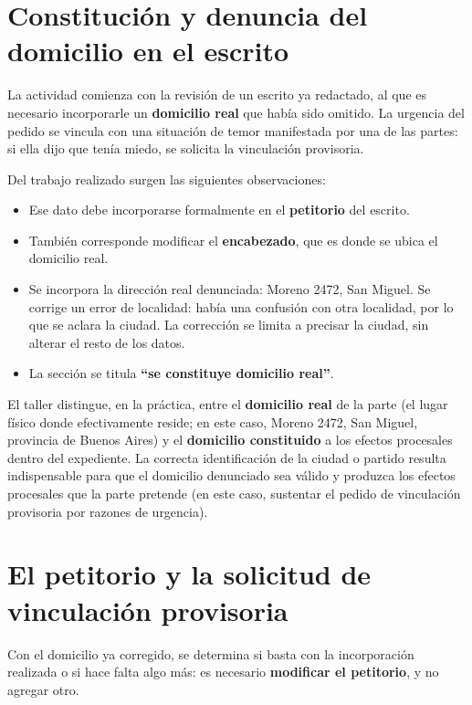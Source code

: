 \documentclass[12pt,oneside]{book}
\begin{document}
\section{Constituci\'on y denuncia del domicilio en el escrito}

La actividad comienza con la revisi\'on de un escrito ya redactado, al que es necesario incorporarle un \textbf{domicilio real} que hab\'ia sido omitido. La urgencia del pedido se vincula con una situaci\'on de temor manifestada por una de las partes: si ella dijo que ten\'ia miedo, se solicita la vinculaci\'on provisoria.

Del trabajo realizado surgen las siguientes observaciones:
\begin{itemize}
    \item Ese dato debe incorporarse formalmente en el \textbf{petitorio} del escrito.
    \item Tambi\'en corresponde modificar el \textbf{encabezado}, que es donde se ubica el domicilio real.
    \item Se incorpora la direcci\'on real denunciada: Moreno 2472, San Miguel. Se corrige un error de localidad: hab\'ia una confusi\'on con otra localidad, por lo que se aclara la ciudad. La correcci\'on se limita a precisar la ciudad, sin alterar el resto de los datos.
    \item La secci\'on se titula \textbf{``se constituye domicilio real''}.
\end{itemize}

\begin{important}
El taller distingue, en la pr\'actica, entre el \textbf{domicilio real} de la parte (el lugar f\'isico donde efectivamente reside; en este caso, Moreno 2472, San Miguel, provincia de Buenos Aires) y el \textbf{domicilio constituido} a los efectos procesales dentro del expediente. La correcta identificaci\'on de la ciudad o partido resulta indispensable para que el domicilio denunciado sea v\'alido y produzca los efectos procesales que la parte pretende (en este caso, sustentar el pedido de vinculaci\'on provisoria por razones de urgencia).
\end{important}

\section{El petitorio y la solicitud de vinculaci\'on provisoria}

Con el domicilio ya corregido, se determina si basta con la incorporaci\'on realizada o si hace falta algo m\'as: es necesario \textbf{modificar el petitorio}, y no agregar otro.
\end{document}
